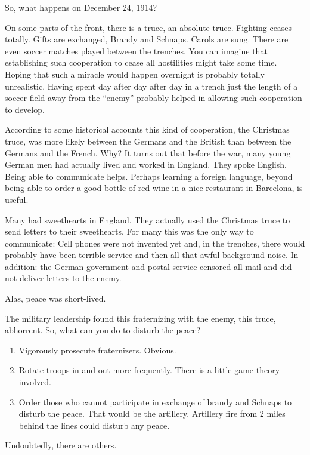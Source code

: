 \documentclass[
]{book}
\providecommand{\tightlist}{%
  \setlength{\itemsep}{0pt}\setlength{\parskip}{0pt}}
\begin{document}
So, what happens on December 24, 1914?

On some parts of the front, there is a truce, an absolute truce. Fighting ceases totally. Gifts are exchanged, Brandy and Schnaps. Carols are sung. There are even soccer matches played between the trenches.
You can imagine that establishing such cooperation to cease all hostilities might take some time. Hoping that such a miracle would happen overnight is probably totally unrealistic. Having spent day after day after day in a trench just the length of a soccer field away from the ``enemy'' probably helped in allowing such cooperation to develop.

According to some historical accounts this kind of cooperation, the Christmas truce, was more likely between the Germans and the British than between the Germans and the French. Why? It turns out that before the war, many young German men had actually lived and worked in England. They spoke English. Being able to communicate helps. Perhaps learning a foreign language, beyond being able to order a good bottle of red wine in a nice restaurant in Barcelona, is useful.

Many had sweethearts in England. They actually used the Christmas truce to send letters to their sweethearts. For many this was the only way to communicate: Cell phones were not invented yet and, in the trenches, there would probably have been terrible service and then all that awful background noise. In addition: the German government and postal service censored all mail and did not deliver letters to the enemy.

Alas, peace was short-lived.

The military leadership found this fraternizing with the enemy, this truce, abhorrent. So, what can you do to disturb the peace?

\begin{enumerate}
\def\labelenumi{\arabic{enumi}.}
\tightlist
\item
  Vigorously prosecute fraternizers. Obvious.
\item
  Rotate troops in and out more frequently. There is a little game theory involved.
\item
  Order those who cannot participate in exchange of brandy and Schnaps to disturb the peace. That would be the artillery. Artillery fire from 2 miles behind the lines could disturb any peace.
\end{enumerate}

Undoubtedly, there are others.
\end{document}
